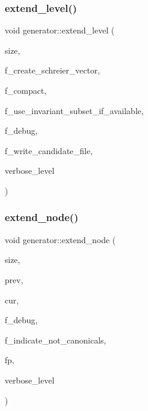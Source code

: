 \mbox{\label{classgenerator_a91b84d80ccec0cd2136bc221c30e0f8e}} 
\subsubsection{\texorpdfstring{extend\+\_\+level()}{extend\_level()}}
{\footnotesize\ttfamily void generator\+::extend\+\_\+level (\begin{DoxyParamCaption}\item[{\mbox{\hyperlink{galois_8h_a09fddde158a3a20bd2dcadb609de11dc}{I\+NT}}}]{size,  }\item[{\mbox{\hyperlink{galois_8h_a09fddde158a3a20bd2dcadb609de11dc}{I\+NT}}}]{f\+\_\+create\+\_\+schreier\+\_\+vector,  }\item[{\mbox{\hyperlink{galois_8h_a09fddde158a3a20bd2dcadb609de11dc}{I\+NT}}}]{f\+\_\+compact,  }\item[{\mbox{\hyperlink{galois_8h_a09fddde158a3a20bd2dcadb609de11dc}{I\+NT}}}]{f\+\_\+use\+\_\+invariant\+\_\+subset\+\_\+if\+\_\+available,  }\item[{\mbox{\hyperlink{galois_8h_a09fddde158a3a20bd2dcadb609de11dc}{I\+NT}}}]{f\+\_\+debug,  }\item[{\mbox{\hyperlink{galois_8h_a09fddde158a3a20bd2dcadb609de11dc}{I\+NT}}}]{f\+\_\+write\+\_\+candidate\+\_\+file,  }\item[{\mbox{\hyperlink{galois_8h_a09fddde158a3a20bd2dcadb609de11dc}{I\+NT}}}]{verbose\+\_\+level }\end{DoxyParamCaption})}

\mbox{\label{classgenerator_ac71fa071cf218f54cdd9306a541744ae}} 
\subsubsection{\texorpdfstring{extend\+\_\+node()}{extend\_node()}}
{\footnotesize\ttfamily void generator\+::extend\+\_\+node (\begin{DoxyParamCaption}\item[{\mbox{\hyperlink{galois_8h_a09fddde158a3a20bd2dcadb609de11dc}{I\+NT}}}]{size,  }\item[{\mbox{\hyperlink{galois_8h_a09fddde158a3a20bd2dcadb609de11dc}{I\+NT}}}]{prev,  }\item[{\mbox{\hyperlink{galois_8h_a09fddde158a3a20bd2dcadb609de11dc}{I\+NT}} \&}]{cur,  }\item[{\mbox{\hyperlink{galois_8h_a09fddde158a3a20bd2dcadb609de11dc}{I\+NT}}}]{f\+\_\+debug,  }\item[{\mbox{\hyperlink{galois_8h_a09fddde158a3a20bd2dcadb609de11dc}{I\+NT}}}]{f\+\_\+indicate\+\_\+not\+\_\+canonicals,  }\item[{F\+I\+LE $\ast$}]{fp,  }\item[{\mbox{\hyperlink{galois_8h_a09fddde158a3a20bd2dcadb609de11dc}{I\+NT}}}]{verbose\+\_\+level }\end{DoxyParamCaption})}

